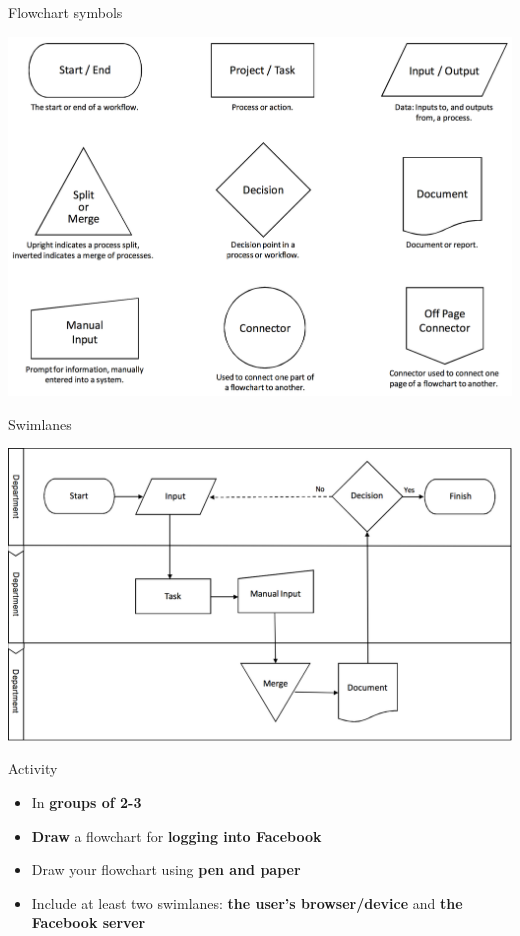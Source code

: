 \begin{frame}{Flowchart symbols}
	\begin{center}
		\includegraphics[height=0.8\textheight]{flowchart_symbols}
	\end{center}
\end{frame}

\begin{frame}{Swimlanes}
	\begin{center}
		\includegraphics[width=\textwidth]{swimlanes}
	\end{center}
\end{frame}

\begin{frame}{Activity}
	\begin{itemize}
		\item In \textbf{groups of 2-3}
		\item \textbf{Draw} a flowchart for \textbf{logging into Facebook}
		\item Draw your flowchart using \textbf{pen and paper}
		\item Include at least two swimlanes: \textbf{the user's browser/device} and \textbf{the Facebook server}
	\end{itemize}
\end{frame}

